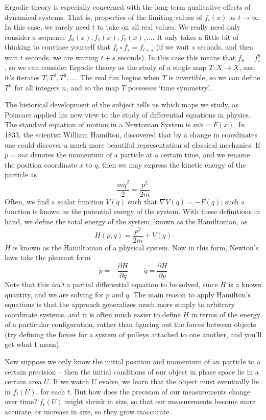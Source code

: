 Ergodic theory is especially concerned with the long-term qualitative effects of dynamical systems. That is, properties of the limiting values of $f_t(x)$ as $t \to \infty$. In this case, we rarely need $t$ to take on all real values. We really need only consider a sequence $f_0(x), f_1(x), f_2(x), \dots$. It only takes a little bit of thinking to convince yourself that $f_t \circ f_s = f_{t+s}$ (if we wait $s$ seconds, and then wait $t$ seconds, we are waiting $t + s$ seconds). In this case this means that $f_n = f_1^n$, so we can consider Ergodic theory as the study of a single map $T:X \to X$, and it's iterates $T, T^2, T^3, \dots$. The real fun begins when $T$ is invertible, so we can define $T^n$ for all integers $n$, and so the map $T$ possesses `time symmetry'.

The historical development of the subject tells us which maps we study, as Poincare applied his new view to the study of differential equations in physics. The standard equation of motion in a Newtonian System is $m \ddot{x} = F(x)$. In 1833, the scientist William Hamilton, discovered that by a change in coordinates one could discover a much more beautiful representation of classical mechanics. If $p = m \dot{x}$ denotes the momentum of a particle at a certain time, and we rename the position coordinate $x$ to $q$, then we may express the kinetic energy of the particle as
%
\[ \frac{m\dot{q}^2}{2} = \frac{p^2}{2m} \]
%
Often, we find a scalar function $V(q)$ such that $\nabla V(q) = - F(q)$; such a function is known as the potential energy of the system. With these definitions in hand, we define the total energy of the system, known as the Hamiltonian, as
%
\[ H(p,q) = \frac{p^2}{2m} + V(q) \]
%
$H$ is known as the Hamiltonian of a physical system. Now in this form, Newton's laws take the pleasant form
%
\[ \dot{p} = - \frac{\partial H}{\partial q}\ \ \ \ \ \ \ \ \ \ \dot{q} = \frac{\partial H}{\partial p} \]
%
Note that this {\it isn't} a partial differential equation to be solved, since $H$ is a known quantity, and we are solving for $p$ and $q$. The main reason to apply Hamilton's equations is that the approach generalizes much more simply to arbitrary coordinate systems, and it is often much easier to define $H$ in terms of the energy of a particular configuration, rather than figuring out the forces between objects (try defining the forces for a system of pulleys attached to one another, and you'll get what I mean).

Now suppose we only know the initial position and momentum of an particle to a certain precision -- then the initial conditions of our object in phase space lie in a certain area $U$. If we watch $U$ evolve, we learn that the object must eventually lie in $f_t(U)$, for each $t$. But how does the precision of our measurements change over time? $f_t(U)$ might shrink in size, so that our measurements become more accurate, or increase in size, so they grow inaccurate.

